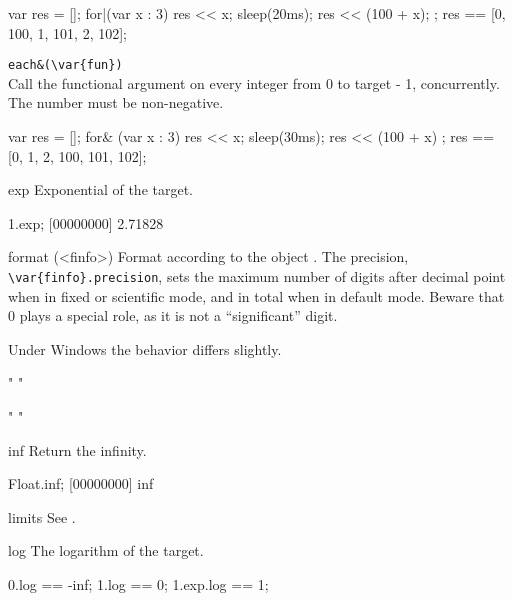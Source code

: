 \begin{urbiscriptapi}
\begin{urbiassert}
{
  var res = [];
  for|(var x : 3) { res << x; sleep(20ms); res << (100 + x); };
  res
}
== [0, 100, 1, 101, 2, 102];
\end{urbiassert}%

\item \lstinline|each&(\var{fun})|\\
  Call the functional argument  on every integer from 0 to
  target - 1, concurrently.  The number must be non-negative.
\begin{urbiassert}
{
  var res = [];
  for& (var x : 3) { res << x; sleep(30ms); res << (100 + x) };
  res
}
== [0, 1, 2, 100, 101, 102];
\end{urbiassert}%

\item[exp]
  Exponential of the target.
\begin{urbiscript}
1.exp;
[00000000] 2.71828
\end{urbiscript}

\item[format](<finfo>)%
  Format according to the  object .
  The precision, \lstinline|\var{finfo}.precision|, sets the maximum
  number of digits after decimal point when in fixed or scientific
  mode, and in total when in default mode.  Beware that 0 plays a
  special role, as it is not a ``significant'' digit.

  \begin{windows}
    Under Windows the behavior differs slightly.
  \end{windows}
\begin{urbiassert}
"%
"%

"%
"%
\end{urbiassert}

\item[inf]
  Return the infinity.
\begin{urbiscript}
Float.inf;
[00000000] inf
\end{urbiscript}

\item[limits]
  See .

\item[log]
  The logarithm of the target.
\begin{urbiassert}
0.log == -inf;
1.log == 0;
1.exp.log == 1;
\end{urbiassert}


\end{urbiscriptapi}
